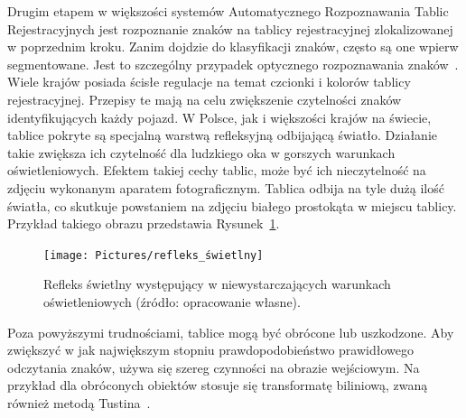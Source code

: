 Drugim etapem w większości systemów Automatycznego Rozpoznawania Tablic Rejestracyjnych jest rozpoznanie znaków na tablicy rejestracyjnej zlokalizowanej w poprzednim kroku.
Zanim dojdzie do klasyfikacji znaków, często są one wpierw segmentowane.
Jest to szczególny przypadek optycznego rozpoznawania znaków~\cite{9310202}.
Wiele krajów posiada ścisłe regulacje na temat czcionki i kolorów tablicy rejestracyjnej.
Przepisy te mają na celu zwiększenie czytelności znaków identyfikujących każdy pojazd.
W Polsce, jak i większości krajów na świecie, tablice pokryte są specjalną warstwą refleksyjną odbijającą światło.
Działanie takie zwiększa ich czytelność dla ludzkiego oka w gorszych warunkach oświetleniowych.
Efektem takiej cechy tablic, może być ich nieczytelność na zdjęciu wykonanym aparatem fotograficznym.
Tablica odbija na tyle dużą ilość światła, co skutkuje powstaniem na zdjęciu białego prostokąta w miejscu tablicy.
Przykład takiego obrazu przedstawia Rysunek~\ref{fig:refleks_swietlny}.
\begin{figure}[!ht]
    \centering
    \texttt{[image: Pictures/refleks\_świetlny]}
    \caption{Refleks świetlny występujący w niewystarczających warunkach oświetleniowych (źródło: opracowanie własne).}
    \label{fig:refleks_swietlny}
\end{figure}
\FloatBarrier
Poza powyższymi trudnościami, tablice mogą być obrócone lub uszkodzone.
Aby zwiększyć w jak największym stopniu prawdopodobieństwo prawidłowego odczytania znaków, używa się szereg czynności na obrazie wejściowym.
Na przykład dla obróconych obiektów stosuje się transformatę biliniową, zwaną również metodą Tustina~\cite{Xu2006AMO}.

